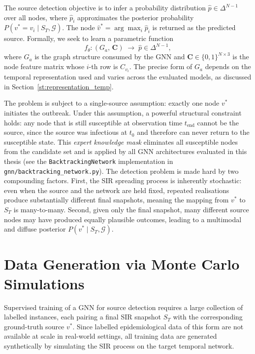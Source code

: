 The source detection objective is to infer a probability distribution $\hat{p} \in \Delta^{N-1}$ over all nodes, where $\hat{p}_i$ approximates the posterior probability $P(v^* = v_i \mid S_T, \mathcal{G})$. The node $\hat{v}^* = \arg\max_i \hat{p}_i$ is returned as the predicted source. Formally, we seek to learn a parametric function
\[
    f_\theta : (G_a,\, \mathbf{C}) \;\longrightarrow\; \hat{p} \in \Delta^{N-1},
\]
where $G_a$ is the graph structure consumed by the GNN and $\mathbf{C} \in \{0,1\}^{N \times 3}$ is the node feature matrix whose $i$-th row is $C_{v_i}$. The precise form of $G_a$ depends on the temporal representation used and varies across the evaluated models, as discussed in Section~\ref{st:representation_temp}.

The problem is subject to a single-source assumption: exactly one node $v^*$ initiates the outbreak. Under this assumption, a powerful structural constraint holds: any node that is still susceptible at observation time $t_{\mathrm{end}}$ cannot be the source, since the source was infectious at $t_0$ and therefore can never return to the susceptible state. This \textit{expert knowledge mask} eliminates all susceptible nodes from the candidate set and is applied by all GNN architectures evaluated in this thesis (see the \texttt{BacktrackingNetwork} implementation in \texttt{gnn/backtracking\_network.py}). The detection problem is made hard by two compounding factors. First, the SIR spreading process is inherently stochastic: even when the source and the network are held fixed, repeated realisations produce substantially different final snapshots, meaning the mapping from $v^*$ to $S_T$ is many-to-many. Second, given only the final snapshot, many different source nodes may have produced equally plausible outcomes, leading to a multimodal and diffuse posterior $P(v^* \mid S_T, \mathcal{G})$.

\section{Data Generation via Monte Carlo Simulations}
\label{st:data_generation}
Supervised training of a GNN for source detection requires a large collection of labelled instances, each pairing a final SIR snapshot $S_T$ with the corresponding ground-truth source $v^*$. Since labelled epidemiological data of this form are not available at scale in real-world settings, all training data are generated synthetically by simulating the SIR process on the target temporal network.

